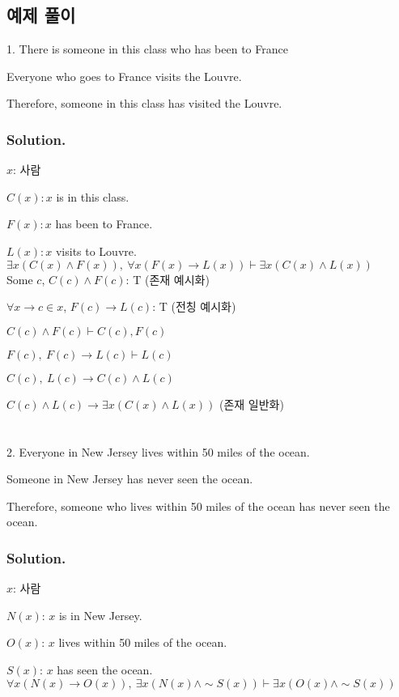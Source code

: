 \subsection{예제 풀이}
1. There is someone in this class who has been to France

Everyone who goes to France visits the Louvre.

Therefore, someone in this class has visited the Louvre.
\subsubsection{Solution.}\hphantom{}

$x$: 사람

$C(x): x$ is in this class.

$F(x): x$ has been to France.

$L(x): x$ visits to Louvre.\\

$\exists x(C(x) \land F(x)),\ \forall x(F(x) \to L(x))\vdash\exists x(C(x)\land L(x))$\\

Some $c$, $C(c)\land F(c)$: T (존재 예시화)

$\forall x \to c \in x$, $F(c) \to L(c)$: T (전칭 예시화)

$C(c) \land F(c) \vdash C(c), F(c)$

$F(c),\ F(c)\to L(c) \vdash L(c)$

$C(c),\ L(c)\to C(c) \land L(c)$

$C(c)\land L(c) \to \exists x (C(x) \land L(x))$ (존재 일반화)\\\\\\
2. Everyone in New Jersey lives within 50 miles of the ocean.

Someone in New Jersey has never seen the ocean.

Therefore, someone who lives within 50 miles of the ocean has never seen the ocean.
\subsubsection{Solution.}\hphantom{}

$x$: 사람

$N(x)$: $x$ is in New Jersey.

$O(x)$: $x$ lives within 50 miles of the ocean.

$S(x)$: $x$ has seen the ocean.\\

$\forall x(N(x)\to O(x)),\ \exists x(N(x) \land \sim S(x)) \vdash \exists x (O(x) \land \sim S(x))$\\

